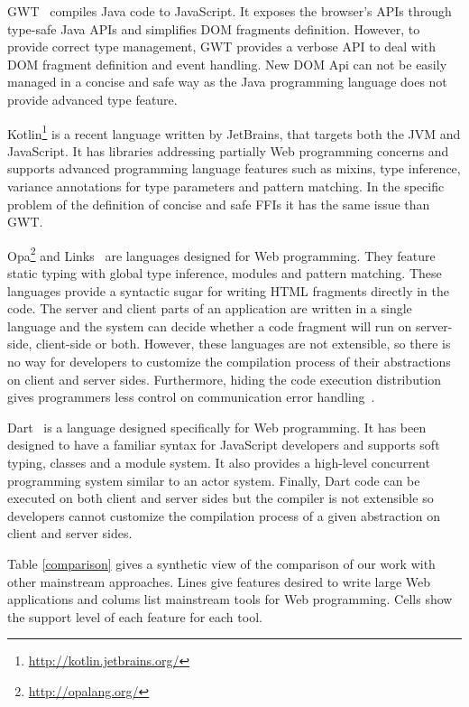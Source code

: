 \documentclass[runningheads,a4paper]{llncs}
\begin{document}
GWT~\cite{Chaganti07_GWT} compiles Java code to JavaScript. It exposes the browser’s APIs through type-safe Java APIs
and simplifies DOM fragments definition. However, to provide correct type management, GWT provides a verbose API to deal with DOM fragment definition and event handling. New DOM Api can not be easily managed in a concise and safe way as the Java programming language does not provide advanced type feature. 

Kotlin\footnote{\href{http://kotlin.jetbrains.org/}{http://kotlin.jetbrains.org/}} is a recent language written by
JetBrains, that targets both the JVM and JavaScript. It has libraries addressing partially Web programming concerns
and supports advanced programming language features such as mixins, type inference, variance annotations for type
parameters and pattern matching. In the specific problem of the definition of concise and safe FFIs it has the same issue than GWT. 

Opa\footnote{\href{http://opalang.org/}{http://opalang.org/}} and Links~\cite{Cooper07_Links} are languages designed
for Web programming. They feature static typing with global type inference, modules and pattern matching. These
languages provide a syntactic sugar for writing HTML fragments directly in the code. The server and client parts of
an application are written in a single language and the system can decide whether a code fragment will run on
server-side, client-side or both. However, these languages are not extensible, so there is no way for developers to
customize the compilation process of their abstractions on client and server sides. Furthermore, hiding the code
execution distribution gives programmers less control on communication error handling~\cite{Guerraoui99_Distributed}.

Dart~\cite{Griffith11_Dart} is a language designed specifically for Web programming. It has been designed to have a
familiar syntax for JavaScript developers and supports soft typing, classes and a module system. It also provides a
high-level concurrent programming system similar to an actor system. Finally, Dart code can be executed on both
client and server sides but the compiler is not extensible so developers cannot customize the compilation process of
a given abstraction on client and server sides.

Table \ref{comparison} gives a synthetic view of the comparison of our work with other mainstream approaches. Lines
give features desired to write large Web applications and colums list mainstream tools for Web programming. Cells
show the support level of each feature for each tool.
\end{document}
